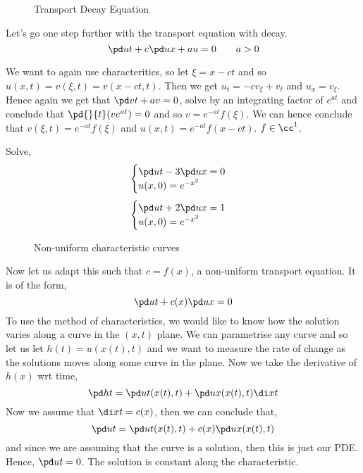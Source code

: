 \begin{wrapfigure}{r}{0.5\textwidth}
  \centering
  \resizebox{0.5\textwidth}{!}{}
  \caption{Transport Decay Equation}
\end{wrapfigure}

\noindent
Let's go one step further with the transport equation with decay.
$$ \pd u t + c \pd u x + au = 0 \qquad a > 0 $$
\begin{eg}
  We want to again use characteritics, so let $\xi = x - ct$ and so $u(x, t) = v(\xi, t) = v(x - ct, t)$. Then we get $u_t = -cv_\xi + v_t$ and $u_x = v_\xi$. Hence again we get that $\pd v t + av = 0$, solve by an integrating factor of $e^{at}$ and conclude that $\pd{}{t}(ve^{at}) = 0$ and so $v = e^{-at}f(\xi)$. We can hence conclude that $v(\xi, t) = e^{-at}f(\xi)$ and $u(x, t) = e^{-at}f(x - ct)$. $f \in \cc^1$.
\end{eg}

\begin{exercise}
  Solve,
  $$ \begin{cases}
    \pd u t - 3\pd u x = 0\\
    u(x, 0) = e^{-x^2}
  \end{cases} $$
  $$ \begin{cases}
    \pd u t + 2\pd u x = 1\\
    u(x, 0) = e^{-x^2}
  \end{cases} $$
\end{exercise}

\begin{wrapfigure}{r}{0.3\textwidth}
  \centering
  \resizebox{0.3\textwidth}{!}{}
  \caption{Non-uniform characteristic curves}
\end{wrapfigure}

Now let us adapt this such that $c = f(x)$, a non-uniform transport equation. It is of the form,
$$ \pd u t + c(x)\pd u x = 0 $$
To use the method of characteristics, we would like to know how the solution varies along a curve in the $(x, t)$ plane. We can parametrise any curve and so let us let $h(t) = u(x(t), t)$ and we want to measure the rate of change as the solutions moves along some curve in the plane. Now we take the derivative of $h(x)$ wrt time,
$$ \pd h t = \pd u t (x(t), t) + \pd u x(x(t), t)\di x t $$
Now we assume that $\di x t = c(x)$, then we can conclude that, $$\pd u t = \pd u t (x(t), t) + c(x) \pd u x(x(t), t)$$
and since we are assuming that the curve is a solution, then this is just our PDE. Hence, $\pd u t = 0$. The solution is constant along the characteristic.

